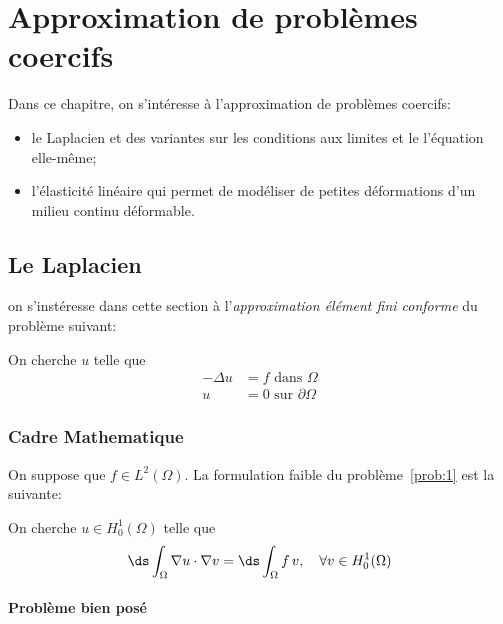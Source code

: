 \chapter{Approximation de problèmes coercifs}
\label{cha:appr-de-probl}

Dans ce chapitre, on s'intéresse à l'approximation de problèmes coercifs:
\begin{itemize}
\item le Laplacien et des variantes sur les conditions aux limites et le
  l'équation elle-même;
\item l'élasticité linéaire qui permet de modéliser de petites déformations
  d'un milieu continu déformable.
\end{itemize}

\section{Le Laplacien}
\label{sec:le-laplacien}

on s'instéresse dans cette section à l'\emph{approximation élément fini
conforme} du problème suivant:
\begin{problem}
  \label{prob:1}
  On cherche $u$ telle que
  \begin{equation}
    \label{eq:64}
    \begin{split}
      -\Delta u &= f \mbox{ dans } \Omega\\
      u &= 0 \mbox{ sur } \partial \Omega
    \end{split}
  \end{equation}
\end{problem}


\subsection{Cadre Mathematique}
\label{sec:cadre-mathematique}

On suppose que $f \in L^2(\Omega)$. La formulation faible du
problème~\ref{prob:1} est la suivante:
\begin{problem}
  \label{prob:2}
  On cherche $u \in H^1_0(\Omega)$ telle que
  \begin{equation}
    \label{eq:65}
    \ds\int_\Omega \nabla u \cdot \nabla v = \ds \int_\Omega f\, v,\quad \forall v \in H^1_0(\Omega)
  \end{equation}
\end{problem}

\subsubsection{Problème bien posé}
\label{sec:probleme-bien-pose}

